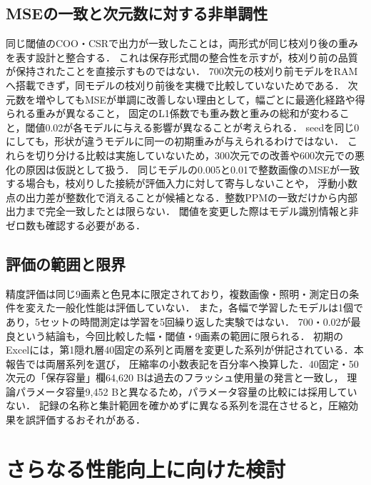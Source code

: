 \documentclass[a4paper,11pt]{article}
\begin{document}
\subsection{MSEの一致と次元数に対する非単調性}

同じ閾値のCOO・CSRで出力が一致したことは，両形式が同じ枝刈り後の重みを表す設計と整合する．
これは保存形式間の整合性を示すが，枝刈り前の品質が保持されたことを直接示すものではない．
700次元の枝刈り前モデルをRAMへ搭載できず，同モデルの枝刈り前後を実機で比較していないためである．
次元数を増やしてもMSEが単調に改善しない理由として，幅ごとに最適化経路や得られる重みが異なること，
固定のL1係数でも重み数と重みの総和が変わること，閾値0.02が各モデルに与える影響が異なることが考えられる．
seedを同じ0にしても，形状が違うモデルに同一の初期重みが与えられるわけではない．
これらを切り分ける比較は実施していないため，300次元での改善や600次元での悪化の原因は仮説として扱う．
同じモデルの0.005と0.01で整数画像のMSEが一致する場合も，枝刈りした接続が評価入力に対して寄与しないことや，
浮動小数点の出力差が整数化で消えることが候補となる．整数PPMの一致だけから内部出力まで完全一致したとは限らない．
閾値を変更した際はモデル識別情報と非ゼロ数も確認する必要がある．

\subsection{評価の範囲と限界}

精度評価は同じ9画素と色見本に限定されており，複数画像・照明・測定日の条件を変えた一般化性能は評価していない．
また，各幅で学習したモデルは1個であり，5セットの時間測定は学習を5回繰り返した実験ではない．
700・0.02が最良という結論も，今回比較した幅・閾値・9画素の範囲に限られる．
初期のExcelには，第1隠れ層40固定の系列と両層を変更した系列が併記されている．本報告では両層系列を選び，
圧縮率の小数表記を百分率へ換算した．40固定・50次元の「保存容量」欄64,620 Bは過去のフラッシュ使用量の発言と一致し，
理論パラメータ容量9,452 Bと異なるため，パラメータ容量の比較には採用していない．
記録の名称と集計範囲を確かめずに異なる系列を混在させると，圧縮効果を誤評価するおそれがある．

\section{さらなる性能向上に向けた検討}
\end{document}

